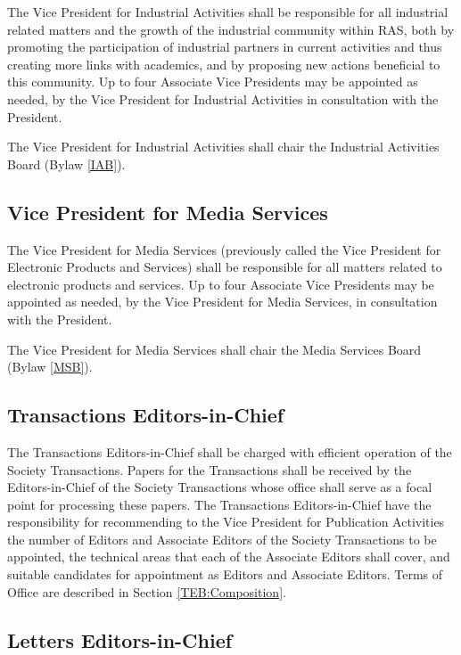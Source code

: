 \documentclass[10pt]{article}
\newcommand{\blref}[1]{Bylaw \ref{#1}}
\newcommand{\secref}[1]{Section \ref{#1}}
\begin{document}
The Vice President for Industrial Activities shall be responsible for all industrial related matters and the growth of the industrial community within RAS, both by promoting the participation of industrial partners in current activities and thus creating more links with academics, and by proposing new actions beneficial to this community. Up to four Associate Vice Presidents may be appointed as needed, by the Vice President for Industrial Activities in consultation with the President. 

The Vice President for Industrial Activities shall chair the Industrial Activities Board (\blref{IAB}). 



\subsection{Vice President for Media Services}

The Vice President for Media Services (previously called the Vice President for Electronic Products and Services) shall be responsible for all matters related to electronic products and services. Up to four Associate Vice Presidents may be appointed as needed, by the Vice President for Media Services, in consultation with the President. 

The Vice President for Media Services shall chair the Media Services Board (\blref{MSB}).



\subsection{Transactions Editors-in-Chief}

The Transactions Editors-in-Chief shall be charged with efficient operation of the Society Transactions.  Papers for the Transactions shall be received by the Editors-in-Chief of the Society Transactions whose office shall serve as a focal point for processing these papers. The Transactions Editors-in-Chief have the responsibility for recommending to the Vice President for Publication Activities the number of Editors and Associate Editors of the Society Transactions to be appointed, the technical areas that each of the Associate Editors shall cover, and suitable candidates for appointment as Editors and Associate Editors. Terms of Office are described in \secref{TEB:Composition}.


\subsection{Letters Editors-in-Chief}
\end{document}
